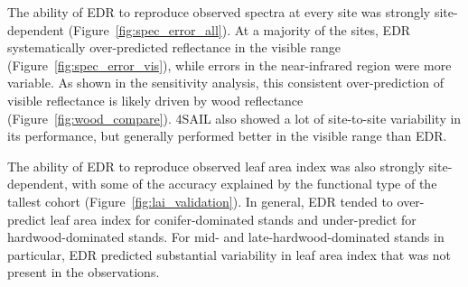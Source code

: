 

The ability of EDR to reproduce observed spectra at every site was strongly site-dependent (Figure~\ref{fig:spec_error_all}).
At a majority of the sites, EDR systematically over-predicted reflectance in the visible range (Figure~\ref{fig:spec_error_vis}), while errors in the near-infrared region were more variable.
As shown in the sensitivity analysis, this consistent over-prediction of visible reflectance is likely driven by wood reflectance (Figure~\ref{fig:wood_compare}).
4SAIL also showed a lot of site-to-site variability in its performance, but generally performed better in the visible range than EDR\@.


The ability of EDR to reproduce observed leaf area index was also strongly site-dependent, with some of the accuracy explained by the functional type of the tallest cohort (Figure~\ref{fig:lai_validation}).
In general, EDR tended to over-predict leaf area index for conifer-dominated stands and under-predict for hardwood-dominated stands.
For mid- and late-hardwood-dominated stands in particular, EDR predicted substantial variability in leaf area index that was not present in the observations.

